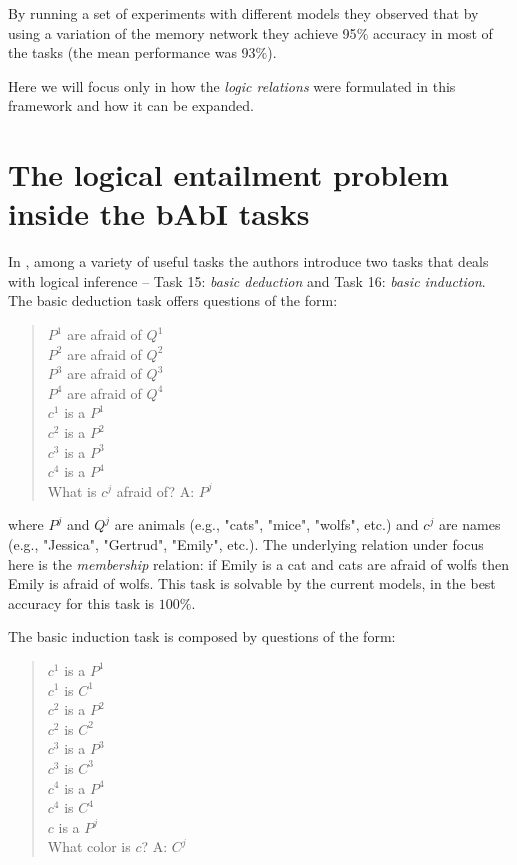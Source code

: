 By running a set of experiments with different models they observed that by using a variation of the memory network they achieve 95$\%$ accuracy in most of the tasks (the mean performance was 93$\%$).

Here we will focus only in how the \textit{logic relations} were formulated in this framework and how it can be expanded.

\section{The logical entailment problem inside the bAbI tasks}
\label{ch:03-tasks}


In \cite{WestonBCM15}, among a variety of useful tasks the authors introduce two tasks that deals with logical inference -- Task 15: \textit{basic deduction} and Task 16: \textit{basic induction}. The basic deduction task offers questions of the form:

\begin{quote} 
\centering 
$P^{1}$ are afraid of $Q^{1}$\\
$P^{2}$ are afraid of $Q^{2}$\\
$P^{3}$ are afraid of $Q^{3}$\\
$P^{4}$ are afraid of $Q^{4}$\\
$c^{1}$ is a $P^{1}$\\
$c^{2}$ is a $P^{2}$\\
$c^{3}$ is a $P^{3}$\\
$c^{4}$ is a $P^{4}$\\
What is $c^j$ afraid of? A: $P^{j}$\\
\end{quote}

where $P^j$ and $Q^j$ are animals (e.g., "cats", "mice", "wolfs", etc.) and $c^j$ are names (e.g., "Jessica", "Gertrud", "Emily", etc.). The underlying relation under focus here is the \textit{membership} relation: if Emily is a cat and cats are afraid of wolfs then Emily is afraid of wolfs. This task is solvable by the current models, in \cite{WestonBCM15} the best accuracy for this task is $100\%$. 

The basic induction task is composed by questions of the form:

\begin{quote} 
\centering 
$c^{1}$ is a $P^{1}$\\
$c^{1}$ is $C^{1}$\\
$c^{2}$ is a $P^{2}$\\
$c^{2}$ is $C^{2}$\\
$c^{3}$ is a $P^{3}$\\
$c^{3}$ is $C^{3}$\\
$c^{4}$ is a $P^{4}$\\
$c^{4}$ is $C^{4}$\\
$c$ is a $P^{j}$\\
What color is $c$? A: $C^{j}$\\
\end{quote}

